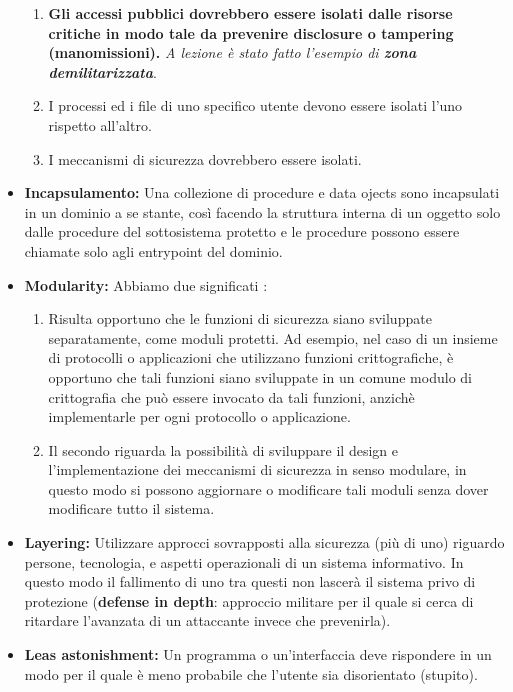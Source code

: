 \documentclass[12pt]{article}
\begin{document}
\begin{itemize}
\begin{enumerate}
					\item \textbf{Gli accessi pubblici dovrebbero essere isolati dalle risorse critiche in modo tale da prevenire disclosure o tampering (manomissioni).} \textit{A lezione è stato fatto l'esempio di \textbf{zona demilitarizzata}}.	
					\item I processi ed i file di uno specifico utente devono essere isolati l'uno rispetto all'altro.
					\item I meccanismi di sicurezza dovrebbero essere isolati.
				\end{enumerate}
				\item \textbf{Incapsulamento:} Una collezione di procedure e data ojects sono incapsulati in un dominio a se stante, così facendo la struttura interna di un oggetto solo dalle procedure del sottosistema protetto e le procedure possono essere chiamate solo agli entrypoint del dominio.
				\item \textbf{Modularity:} Abbiamo due significati :
				\begin{enumerate}
					\item Risulta opportuno che le funzioni di sicurezza siano sviluppate separatamente, come moduli protetti. Ad esempio, nel caso di un insieme di protocolli o applicazioni che utilizzano funzioni crittografiche, è opportuno che tali funzioni siano sviluppate in un comune modulo di crittografia che può essere invocato da tali funzioni, anzichè implementarle per ogni protocollo o applicazione.
					\item Il secondo riguarda la possibilità di sviluppare il design e l'implementazione dei meccanismi di sicurezza in senso modulare, in questo modo si possono aggiornare o modificare tali moduli senza dover modificare tutto il sistema.
				\end{enumerate}
				\item \textbf{Layering:} Utilizzare approcci sovrapposti alla sicurezza (più di uno) riguardo persone, tecnologia, e aspetti operazionali di un sistema informativo. In questo modo il fallimento di uno tra questi non lascerà il sistema privo di protezione (\textbf{defense in depth}: approccio militare per il quale si cerca di ritardare l'avanzata di un attaccante invece che prevenirla).
				\item \textbf{Leas astonishment:} Un programma o un'interfaccia deve rispondere in un modo per il quale è meno probabile che l'utente sia disorientato (stupito).
			\end{itemize}
\end{document}
